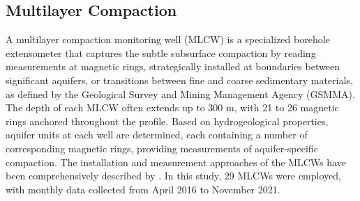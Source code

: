 
\subsection{Multilayer Compaction}
\label{subsubsec:mlcw}

A multilayer compaction monitoring well (MLCW) is a specialized borehole extensometer that captures the subtle subsurface compaction by reading measurements at magnetic rings, strategically installed at boundaries between significant aquifers, or transitions between fine and coarse sedimentary materials, as defined by the Geological Survey and Mining Management Agency (GSMMA).  The depth of each MLCW often extends up to 300 m, with 21 to 26 magnetic rings anchored throughout the profile. Based on hydrogeological properties, aquifer units at each well are determined, each containing a number of corresponding magnetic rings, providing measurements of aquifer-specific compaction. The installation and measurement approaches of the MLCWs have been comprehensively described by \citep{Hung2021_MLCW}. In this study, 29 MLCWs were employed, with monthly data collected from April 2016 to November 2021.


